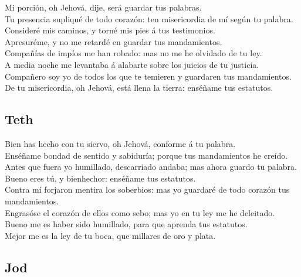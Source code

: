  Mi porción, oh Jehová, dije, será guardar tus palabras.\\
 Tu presencia supliqué de todo corazón: ten misericordia de
mí según tu palabra.\\
 Consideré mis caminos, y torné mis pies á tus
testimonios.\\
 Apresuréme, y no me retardé en guardar tus mandamientos.\\
 Compañías de impíos me han robado: mas no me he olvidado
de tu ley.\\
 A media noche me levantaba á alabarte sobre los juicios de
tu justicia.\\
 Compañero soy yo de todos los que te temieren y guardaren
tus mandamientos.\\
 De tu misericordia, oh Jehová, está llena la tierra:
enséñame tus estatutos.

\hypertarget{teth}{%
\subsection{Teth}\label{teth}}

 Bien has hecho con tu siervo, oh Jehová, conforme á tu
palabra.\\
 Enséñame bondad de sentido y sabiduría; porque tus
mandamientos he creído.\\
 Antes que fuera yo humillado, descarriado andaba; mas
ahora guardo tu palabra.\\
 Bueno eres tú, y bienhechor: enséñame tus estatutos.\\
 Contra mí forjaron mentira los soberbios: mas yo guardaré
de todo corazón tus mandamientos.\\
 Engrasóse el corazón de ellos como sebo; mas yo en tu ley
me he deleitado.\\
 Bueno me es haber sido humillado, para que aprenda tus
estatutos.\\
 Mejor me es la ley de tu boca, que millares de oro y
plata.

\hypertarget{jod}{%
\subsection{Jod}\label{jod}}

